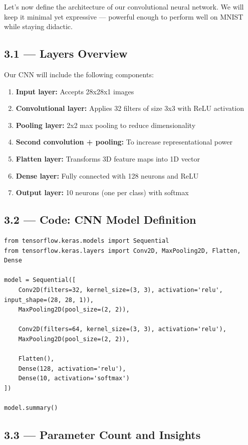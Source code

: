\documentclass[11pt]{article}
\begin{document}
Let’s now define the architecture of our convolutional neural network. We will keep it minimal yet expressive — powerful enough to perform well on MNIST while staying didactic.

\subsection*{\textbf{3.1 — Layers Overview}}

Our CNN will include the following components:

\begin{enumerate}
    \item \textbf{Input layer:} Accepts 28x28x1 images
    \item \textbf{Convolutional layer:} Applies 32 filters of size 3x3 with ReLU activation
    \item \textbf{Pooling layer:} 2x2 max pooling to reduce dimensionality
    \item \textbf{Second convolution + pooling:} To increase representational power
    \item \textbf{Flatten layer:} Transforms 3D feature maps into 1D vector
    \item \textbf{Dense layer:} Fully connected with 128 neurons and ReLU
    \item \textbf{Output layer:} 10 neurons (one per class) with softmax
\end{enumerate}

\subsection*{\textbf{3.2 — Code: CNN Model Definition}}

\begin{verbatim}
from tensorflow.keras.models import Sequential
from tensorflow.keras.layers import Conv2D, MaxPooling2D, Flatten, Dense

model = Sequential([
    Conv2D(filters=32, kernel_size=(3, 3), activation='relu', input_shape=(28, 28, 1)),
    MaxPooling2D(pool_size=(2, 2)),

    Conv2D(filters=64, kernel_size=(3, 3), activation='relu'),
    MaxPooling2D(pool_size=(2, 2)),

    Flatten(),
    Dense(128, activation='relu'),
    Dense(10, activation='softmax')
])

model.summary()
\end{verbatim}

\subsection*{\textbf{3.3 — Parameter Count and Insights}}
\end{document}
